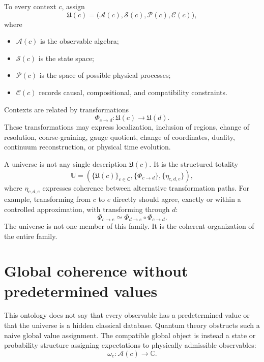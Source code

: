 \documentclass[11pt]{article}
\newcommand{\cA}{\mathcal{A}}
\newcommand{\cC}{\mathcal{C}}
\newcommand{\cP}{\mathcal{P}}
\newcommand{\cS}{\mathcal{S}}
\begin{document}
To every context $c$, assign
\begin{equation}
  \mathfrak U(c)
  =
  \bigl(
    \cA(c),
    \cS(c),
    \cP(c),
    \cC(c)
  \bigr),
  \label{eq:context-assignment}
\end{equation}
where
\begin{itemize}[leftmargin=2em]
  \item $\cA(c)$ is the observable algebra;
  \item $\cS(c)$ is the state space;
  \item $\cP(c)$ is the space of possible physical processes;
  \item $\cC(c)$ records causal, compositional, and compatibility constraints.
\end{itemize}

Contexts are related by transformations
\begin{equation}
  \Phi_{c\to d}:\mathfrak U(c)\longrightarrow\mathfrak U(d).
  \label{eq:context-map}
\end{equation}
These transformations may express localization, inclusion of regions, change
of resolution, coarse-graining, gauge quotient, change of coordinates, duality,
continuum reconstruction, or physical time evolution.

A universe is not any single description $\mathfrak U(c)$.  It is the
structured totality
\begin{equation}
  \mathbb U
  =
  \left(
    \{\mathfrak U(c)\}_{c\in\mathsf C},
    \{\Phi_{c\to d}\},
    \{\eta_{c,d,e}\}
  \right),
  \label{eq:universe-totality}
\end{equation}
where $\eta_{c,d,e}$ expresses coherence between alternative transformation
paths.  For example, transforming from $c$ to $e$ directly should agree,
exactly or within a controlled approximation, with transforming through $d$:
\begin{equation}
  \Phi_{c\to e}
  \simeq
  \Phi_{d\to e}\circ\Phi_{c\to d}.
  \label{eq:path-coherence}
\end{equation}
The universe is not one member of this family.  It is the coherent organization
of the entire family.

\section{Global coherence without predetermined values}

This ontology does not say that every observable has a predetermined value or
that the universe is a hidden classical database.  Quantum theory obstructs
such a naive global value assignment.  The compatible global object is instead
a state or probability structure assigning expectations to physically
admissible observables:
\begin{equation}
  \omega_c:\cA(c)\longrightarrow\mathbb C.
\end{equation}
\end{document}
